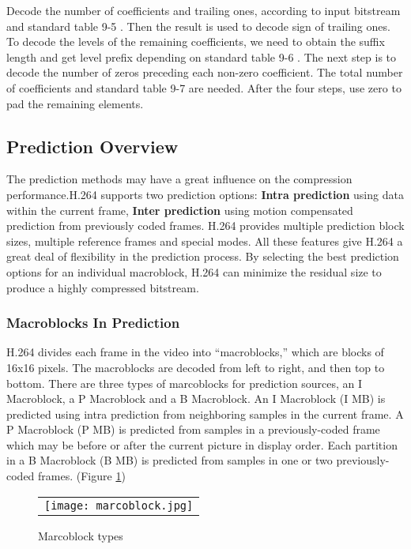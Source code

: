 \documentclass[../main.tex]{subfiles}
\begin{document}
Decode the number of coefficients and trailing ones, according to input bitstream and standard table 9-5 \cite{team2003advanced}. Then the result is used to decode sign of trailing ones. To decode the levels of the remaining coefficients, we need to obtain the suffix length and get level prefix depending on standard table 9-6 \cite{team2003advanced}. The next step is to decode the number of zeros preceding each non-zero coefficient. The total number of coefficients and standard table 9-7 \cite{team2003advanced} are needed. After the four steps, use zero to pad the remaining elements.

\subsection{Prediction Overview}

The prediction methods may have a great influence on the compression performance.H.264 supports two prediction options: \textbf{Intra prediction} using data within
the current frame, \textbf{Inter prediction} using motion compensated prediction from previously
coded frames. H.264 provides multiple prediction block sizes, multiple reference frames and special modes. All these features give H.264 a great deal of flexibility in the prediction process. By selecting the best prediction options for an individual macroblock, H.264 can minimize the residual size to produce a highly compressed bitstream.



\subsubsection{ Macroblocks In Prediction }

H.264 divides each frame in the video into “macroblocks,” which are blocks of 16x16
pixels. The macroblocks are decoded from left to right, and then top to bottom. There are three types of marcoblocks for prediction sources, an I Macroblock, a P Macroblock and a B Macroblock. An I Macroblock (I MB) is predicted using intra prediction from
neighboring samples in the current frame. A P Macroblock (P MB) is predicted from samples
in a previously-coded frame which may be before or after the current picture in display order.  Each partition in a B Macroblock (B MB) is
predicted from samples in one or two previously-coded frames. (Figure \ref{fig:mbtypes})

  \begin{figure} [ht]
   \begin{center}
   \begin{tabular}{c} %
   \texttt{[image: marcoblock.jpg]}
   \end{tabular}
   \end{center}
   \caption[mbtypes] 
   { \label{fig:mbtypes} Marcoblock types \cite{richardson2004h} }
   \end{figure}     %
\end{document}
